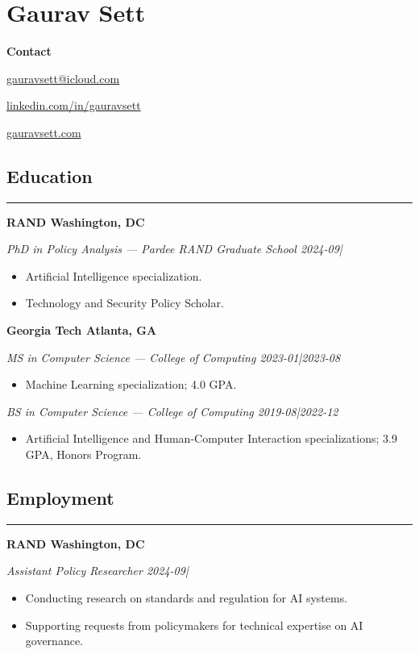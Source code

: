 \documentclass{article}
\newcommand{\headingOne}[1]{
    \subsection*{#1} \hrule
    \vspace*{6pt}
}
\newcommand{\headingTwo}[2]{
    \vspace*{6pt}
    \textbf{#1 \hfill #2}
}
\newcommand{\headingThree}[2]{
    \vspace*{2pt}
    \textsl{#1 \hfill #2}
}
\begin{document}
\section*{Gaurav Sett}

\textbf{Contact}
\begin{itemize*}[label=$|$]
    \item \href{mailto:gauravsett@icloud.com}{gauravsett@icloud.com}
    \item \href{https://linkedin.com/in/gauravsett}{linkedin.com/in/gauravsett}
    \item \href{https://gauravsett.com}{gauravsett.com}
\end{itemize*}


\headingOne{Education}


\headingTwo{RAND}{Washington, DC}

\headingThree{PhD in Policy Analysis — Pardee RAND Graduate School}{2024-09|}
\begin{itemize}
    \item Artificial Intelligence specialization.
    \item Technology and Security Policy Scholar.
\end{itemize}


\headingTwo{Georgia Tech}{Atlanta, GA}

\headingThree{MS in Computer Science — College of Computing}{2023-01|2023-08}
\begin{itemize}
    \item Machine Learning specialization; 4.0 GPA.
\end{itemize}

\headingThree{BS in Computer Science — College of Computing}{2019-08|2022-12}
\begin{itemize}
    \item Artificial Intelligence and Human-Computer Interaction specializations; 3.9 GPA, Honors Program.
\end{itemize}



\headingOne{Employment}


\headingTwo{RAND}{Washington, DC}

\headingThree{Assistant Policy Researcher}{2024-09|}
\begin{itemize}
    \item Conducting research on standards and regulation for AI systems.
    \item Supporting requests from policymakers for technical expertise on AI governance.
\end{itemize}
\end{document}
